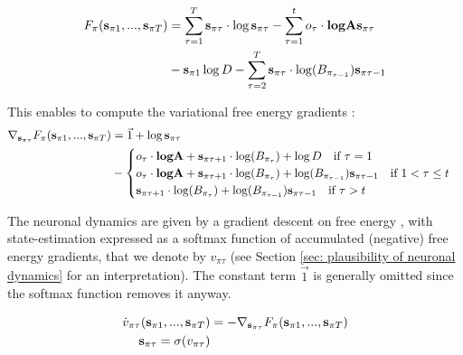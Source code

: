 \documentclass[review,12pt,authoryear]{elsarticle}
\begin{document}
\begin{equation}
\label{eq: vfe pi matrix form perception}
  	    \begin{split}
        F_\pi(\bold s_{\pi 1},...,\bold s_{\pi T}) &= \sum_{\tau = 1}^T \bold s_{\pi \tau } \cdot \log \bold s_{\pi \tau } 
        - \sum_{\tau = 1}^t o_\tau \cdot \textbf{log} \bold A \bold s_{\pi \tau }\\
        &- \bold s_{\pi 1 } \log D- \sum_{\tau = 2}^T \bold s_{\pi \tau } \cdot \log (B_{\pi_{\tau-1}})\bold s_{\pi \tau-1 }
    \end{split}
\end{equation}

This enables to compute the variational free energy gradients \citep{petersenMatrixCookbook2012}:
\begin{equation}
    \label{eq:vfe gradients perception}
    \begin{split}
        \nabla_{\bold s_{\pi\tau}} F_\pi(\bold s_{\pi 1},...,\bold s_{\pi T})& = \vec {1} +\log  \bold s_{\pi\tau}  \\
        &- \begin{cases}
             o_\tau \cdot \textbf{log} \bold A+ \bold s_{\pi\tau+1} \cdot \log (B_{\pi_{\tau}}) + \log D \quad  \text{if } \tau = 1 \\
            o_\tau \cdot \textbf{log} \bold A+ \bold s_{\pi\tau+1} \cdot \log (B_{\pi_{\tau}}) +\log (B_{\pi_{\tau-1}}) \bold s_{\pi\tau-1} \quad \text{if } 1<\tau \leq t  \\
             \bold s_{\pi\tau+1} \cdot \log (B_{\pi_{\tau}}) +\log (B_{\pi_{\tau-1}}) \bold s_{\pi\tau-1} \quad \text{if }  \tau > t
        \end{cases}
    \end{split}
\end{equation}

The neuronal dynamics are given by a gradient descent on free energy \citep{fristonActiveInferenceProcess2017}, with state-estimation expressed as a softmax function of accumulated (negative) free energy gradients, that we denote by $v_{\pi \tau}$ (see Section \ref{sec: plausibility of neuronal dynamics} for an interpretation). The constant term $\vec{1}$ is generally omitted since the softmax function removes it anyway.

  	\begin{equation}
  	\label{eq: perceptual dynamics}
  	    \begin{split}
  	        \dot v_{\pi \tau} (\bold s_{\pi 1},...,\bold s_{\pi T})&=-\nabla_{\bold s_{\pi\tau}} F_\pi(\bold s_{\pi 1},...,\bold s_{\pi T}) \\
  	        \bold s_{\pi\tau} = \sigma (v_{\pi \tau})
  	    \end{split}
  	\end{equation}
  	
\end{document}
